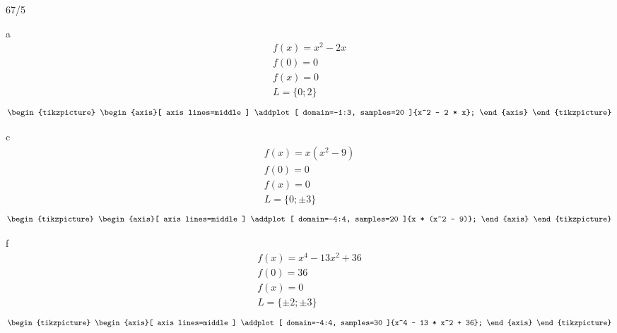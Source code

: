 \begin{exercise}{67/5}
  \item [a]
  \begin{gather*}
    f(x) = x^2 - 2x \\
    f(0) = 0 \\
    f(x) = 0 \\
    L = \{0; 2\}
  \end{gather*}
  \begin{gather*}
    \begin{tikzpicture}
      \begin{axis}[
        axis lines=middle
        ]
        \addplot[
        domain=-1:3,
        samples=20
        ]{x^2 - 2 * x};
      \end{axis}
    \end{tikzpicture}
  \end{gather*}
  \item [c]
  \begin{gather*}
    f(x) = x(x^2 - 9) \\
    f(0) = 0 \\
    f(x) = 0 \\
    L = \{0; \pm 3\}
  \end{gather*}
  \begin{gather*}
    \begin{tikzpicture}
      \begin{axis}[
        axis lines=middle
        ]
        \addplot[
        domain=-4:4,
        samples=20
        ]{x * (x^2 - 9)};
      \end{axis}
    \end{tikzpicture}
  \end{gather*}
  \item [f]
  \begin{gather*}
    f(x) = x^4 - 13x^2 + 36 \\
    f(0) = 36 \\
    f(x) = 0 \\
    L = \{\pm 2; \pm 3\}
  \end{gather*}
  \begin{gather*}
    \begin{tikzpicture}
      \begin{axis}[
        axis lines=middle
        ]
        \addplot[
        domain=-4:4,
        samples=30
        ]{x^4 - 13 * x^2 + 36};
      \end{axis}
    \end{tikzpicture}
  \end{gather*}
\end{exercise}
